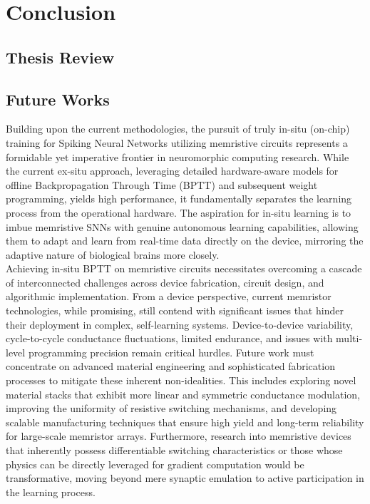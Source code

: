 
\chapter{Conclusion}

\section[Thesis Review]{Thesis Review}

\section[Future Works]{Future Works}

\noindent Building upon the current methodologies, the pursuit of truly in-situ (on-chip) training for Spiking Neural Networks utilizing memristive circuits represents a formidable yet imperative frontier in neuromorphic computing research. While the current ex-situ approach, leveraging detailed hardware-aware models for offline Backpropagation Through Time (BPTT) and subsequent weight programming, yields high performance, it fundamentally separates the learning process from the operational hardware. The aspiration for in-situ learning is to imbue memristive SNNs with genuine autonomous learning capabilities, allowing them to adapt and learn from real-time data directly on the device, mirroring the adaptive nature of biological brains more closely. \\

\noindent Achieving in-situ BPTT on memristive circuits necessitates overcoming a cascade of interconnected challenges across device fabrication, circuit design, and algorithmic implementation. From a device perspective, current memristor technologies, while promising, still contend with significant issues that hinder their deployment in complex, self-learning systems. Device-to-device variability, cycle-to-cycle conductance fluctuations, limited endurance, and issues with multi-level programming precision remain critical hurdles. Future work must concentrate on advanced material engineering and sophisticated fabrication processes to mitigate these inherent non-idealities. This includes exploring novel material stacks that exhibit more linear and symmetric conductance modulation, improving the uniformity of resistive switching mechanisms, and developing scalable manufacturing techniques that ensure high yield and long-term reliability for large-scale memristor arrays. Furthermore, research into memristive devices that inherently possess differentiable switching characteristics or those whose physics can be directly leveraged for gradient computation would be transformative, moving beyond mere synaptic emulation to active participation in the learning process.\\


